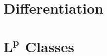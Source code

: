 \documentclass[12pt]{book}
\renewcommand{\.}{\mkern1mu}
\theoremstyle{theorem}
\renewcommand{\bf}[1]{\boldsymbol{#1}}
\begin{document}
\chapter{Differentiation}
\chapter{$\bf{L^p}$ Classes}
\end{document}
